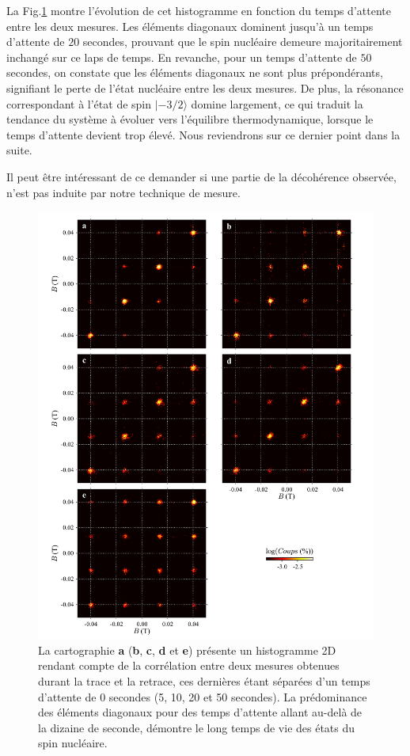 La Fig.\ref{evolution_temps} montre l'évolution de cet histogramme en fonction du temps d'attente entre les deux mesures. Les éléments diagonaux dominent jusqu'à un temps d'attente de $20$ secondes, prouvant que le spin nucléaire demeure majoritairement inchangé sur ce laps de temps. En revanche, pour un temps d'attente de $50$ secondes, on constate que les éléments diagonaux ne sont plus prépondérants, signifiant le perte de l'état nucléaire entre les deux mesures. De plus, la résonance correspondant à l'état de spin $|-3/2 \rangle$ domine largement, ce qui traduit la tendance du système à évoluer vers l'équilibre thermodynamique, lorsque le temps d'attente devient trop élevé. Nous reviendrons sur ce dernier point dans la suite.

Il peut être intéressant de ce demander si une partie de la décohérence observée, n'est pas induite par notre technique de mesure.

\begin{figure}[h!]
\includegraphics[scale=0.45]{Resultats/HistTime/HistTime.pdf} 
\caption{La cartographie \textbf{a} (\textbf{b}, \textbf{c}, \textbf{d} et \textbf{e}) présente un histogramme 2D rendant compte de la corrélation entre deux mesures obtenues durant la trace et la retrace, ces dernières étant séparées d'un temps d'attente de 0 secondes (5, 10, 20 et 50 secondes). La prédominance des éléments diagonaux pour des temps d'attente allant au-delà de la dizaine de seconde, démontre le long temps de vie des états du spin nucléaire.}
\label{evolution_temps}
\end{figure}

